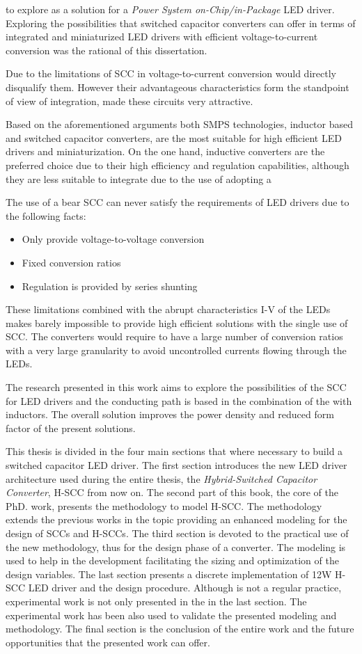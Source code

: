 to explore as a solution for a \emph{Power System on-Chip/in-Package} LED driver.  Exploring the possibilities that switched capacitor converters can offer in terms of integrated and miniaturized LED drivers with efficient voltage-to-current conversion was the rational of this dissertation.



  Due to the limitations of SCC  in voltage-to-current conversion would directly disqualify them. However their advantageous characteristics form the standpoint of view of integration, made these circuits very attractive.

Based on the aforementioned arguments both SMPS technologies, inductor based and switched capacitor converters,   are the most suitable  for high efficient LED drivers and miniaturization. On the one hand, inductive converters are the preferred choice due to their high efficiency and regulation capabilities, although they are less suitable to integrate due to the use of adopting a


The use of a bear SCC can never satisfy the requirements of LED drivers due to the following facts:
\begin{itemize}
  \item Only provide voltage-to-voltage conversion
  \item Fixed conversion ratios
  \item Regulation is provided by series shunting
\end{itemize}
These limitations combined with the abrupt characteristics I-V of the LEDs makes barely impossible to provide high efficient solutions with the single use of SCC. The converters would require to have a large number of conversion ratios with a very large granularity to avoid uncontrolled currents flowing through the LEDs.

The research presented in this work aims to explore the possibilities of the SCC for LED drivers and the conducting path is based in the combination of the with inductors. The overall solution improves the power density and reduced form factor of the present solutions.


This thesis is divided in the four main sections that where necessary to build a switched capacitor LED driver. The first section introduces the new LED driver architecture used during the entire thesis, the \emph{Hybrid-Switched Capacitor Converter}, H-SCC from now on. The second part of this book, the core of the PhD. work, presents the methodology to model H-SCC. The methodology extends the previous works in the topic providing an enhanced modeling for the design of SCCs and H-SCCs. The third section is devoted to the practical use of the new methodology, thus for the design phase of a converter. The modeling is used  to help in the development facilitating the sizing and optimization of the design variables. The last section presents a discrete implementation of 12W H-SCC LED driver and the design procedure. Although is not a regular practice, experimental work is not only presented in the in the last section. The experimental work has been also  used to validate the presented modeling and methodology. The final section is the conclusion of the entire work and the future opportunities that the presented work can offer.

